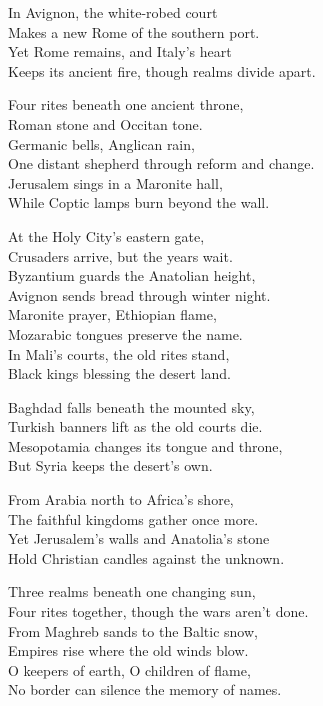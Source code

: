\begin{lyrics}
In Avignon, the white-robed court\\
Makes a new Rome of the southern port.\\
Yet Rome remains, and Italy’s heart\\
Keeps its ancient fire, though realms divide apart.

Four rites beneath one ancient throne,\\
Roman stone and Occitan tone.\\
Germanic bells, Anglican rain,\\
One distant shepherd through reform and change.\\
Jerusalem sings in a Maronite hall,\\
While Coptic lamps burn beyond the wall.

At the Holy City’s eastern gate,\\
Crusaders arrive, but the years wait.\\
Byzantium guards the Anatolian height,\\
Avignon sends bread through winter night.\\
Maronite prayer, Ethiopian flame,\\
Mozarabic tongues preserve the name.\\
In Mali’s courts, the old rites stand,\\
Black kings blessing the desert land.

Baghdad falls beneath the mounted sky,\\
Turkish banners lift as the old courts die.\\
Mesopotamia changes its tongue and throne,\\
But Syria keeps the desert’s own.

From Arabia north to Africa’s shore,\\
The faithful kingdoms gather once more.\\
Yet Jerusalem’s walls and Anatolia’s stone\\
Hold Christian candles against the unknown.

Three realms beneath one changing sun,\\
Four rites together, though the wars aren’t done.\\
From Maghreb sands to the Baltic snow,\\
Empires rise where the old winds blow.\\
O keepers of earth, O children of flame,\\
No border can silence the memory of names.


\end{lyrics}
